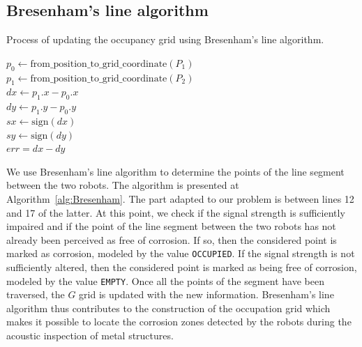 \documentclass[english,RandD]{rapportPFE}  %
\begin{document}
		\subsection*{Bresenham's line algorithm}\label{subsec:Bresenham}
			\begin{algorithm}[h!]
				\caption{Process of updating the occupancy grid using Bresenham's line algorithm.}
				\label{alg:Bresenham}
				$p_0 \gets \text{from\_position\_to\_grid\_coordinate}(P_1)$ \\
				$p_1 \gets \text{from\_position\_to\_grid\_coordinate}(P_2)$ \\
				$dx \gets p_1.x - p_0.x$ \\
				$dy \gets p_1.y - p_0.y$ \\
				$sx \gets \text{sign}(dx)$ \\
				$sy \gets \text{sign}(dy)$ \\
				$err = dx - dy$ \\
			\end{algorithm}

			We use Bresenham's line algorithm to determine the points of the line segment between the two robots.
			The algorithm is presented at Algorithm~\ref{alg:Bresenham}.
			The part adapted to our problem is between lines 12 and 17 of the latter.
			At this point, we check if the signal strength is sufficiently impaired and if the point of the line segment between the two robots has not already been perceived as free of corrosion.
			If so, then the considered point is marked as corrosion, modeled by the value \texttt{OCCUPIED}.
			If the signal strength is not sufficiently altered, then the considered point is marked as being free of corrosion, modeled by the value \texttt{EMPTY}.
			Once all the points of the segment have been traversed, the $G$ grid is updated with the new information.
			Bresenham's line algorithm thus contributes to the construction of the occupation grid which makes it possible to locate the corrosion zones detected by the robots during the acoustic inspection of metal structures.
\end{document}
